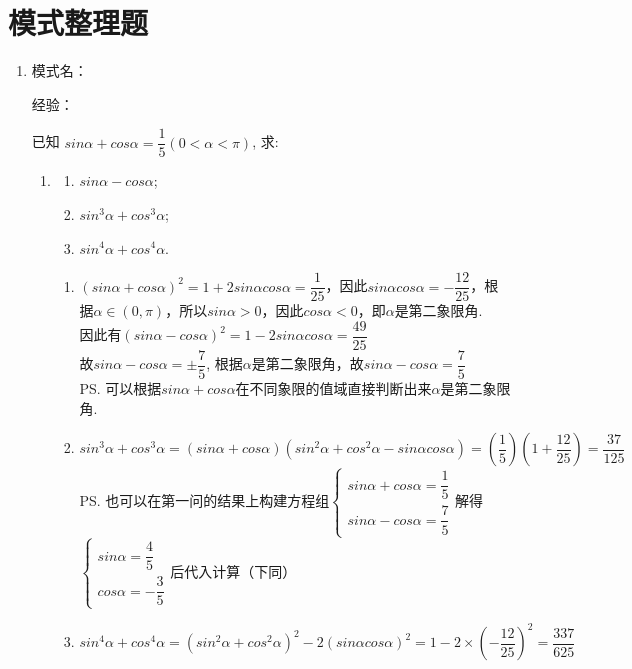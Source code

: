 \section*{模式整理题}
\begin{enumerate}
    \item 
    模式名：

    经验：
    
    已知 $ sin \alpha+ cos \alpha=\dfrac{1}{5}(0<\alpha<\pi)$, 求: 
    \begin{enumerate}
        \item 
        \begin{enumerate}
            \item  $ sin \alpha- cos \alpha$;
            \item  $ sin ^3 \alpha+ cos ^3 \alpha$;
            \item $ sin ^4 \alpha+ cos ^4 \alpha$.
        \end{enumerate}
        \begin{jieda}
            \begin{enumerate}
                \item $(sin\alpha+cos\alpha)^2 = 1 + 2sin\alpha cos\alpha = \dfrac{1}{25}$，因此$sin\alpha cos\alpha = -\dfrac{12}{25}$，根据$\alpha \in (0, \pi)$，所以$sin\alpha > 0$，因此$cos\alpha < 0$，即$\alpha$是第二象限角. \\
                因此有$(sin\alpha - cos\alpha)^2 = 1 - 2sin\alpha cos\alpha = \dfrac{49}{25}$ \\
                故$sin\alpha - cos\alpha = \pm \dfrac{7}{5}$, 根据$\alpha$是第二象限角，故$sin\alpha - cos\alpha = \dfrac{7}{5}$ \\
                \ps 可以根据$sin\alpha + cos\alpha$在不同象限的值域直接判断出来$\alpha$是第二象限角.
                \item $sin^3 \alpha + cos^3 \alpha = (sin\alpha + cos\alpha)(sin^2 \alpha + cos^2 \alpha - sin\alpha cos\alpha) = (\dfrac{1}{5})(1 + \dfrac{12}{25}) = \dfrac{37}{125}$ \\
                \ps 也可以在第一问的结果上构建方程组$\left \{ \begin{array}{l}
                    sin\alpha + cos\alpha = \dfrac{1}{5} \\
                    sin\alpha - cos\alpha = \dfrac{7}{5} 
                \end{array}\right.$解得$\left \{ \begin{array}{l}
                    sin\alpha = \dfrac{4}{5} \\
                    cos\alpha = -\dfrac{3}{5} 
                \end{array}\right.$后代入计算（下同）
                \item $ sin ^4 \alpha+ cos ^4 \alpha = ( sin ^2 \alpha+ cos ^2 \alpha)^2 - 2(sin \alpha cos\alpha)^2 = 1 - 2 \times (-\dfrac{12}{25})^2 = \dfrac{337}{625}$
            \end{enumerate}
        \end{jieda}
        

\end{enumerate}
\end{enumerate}
